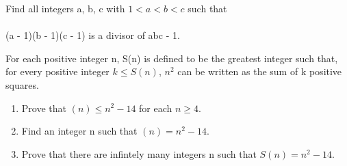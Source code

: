 \item Find all integers a, b, c with $1 < a < b < c$ such that\\
\\ (a - 1)(b - 1)(c - 1) is a divisor of abc - 1.

\item For each positive integer n, S(n) is defined to be the greatest integer
such that, for every positive integer $k \leq S(n)$, $n^2$ can be written as
the sum of k positive squares.
\begin{enumerate}
\item Prove that $(n) \leq n^2 - 14$ for each $n \geq 4$.\\
\item Find an integer n such that $(n) = n^2 - 14$.\\
\item Prove that there are infintely many integers n such that $S(n) =
n^2 - 14$.
\end{enumerate}



